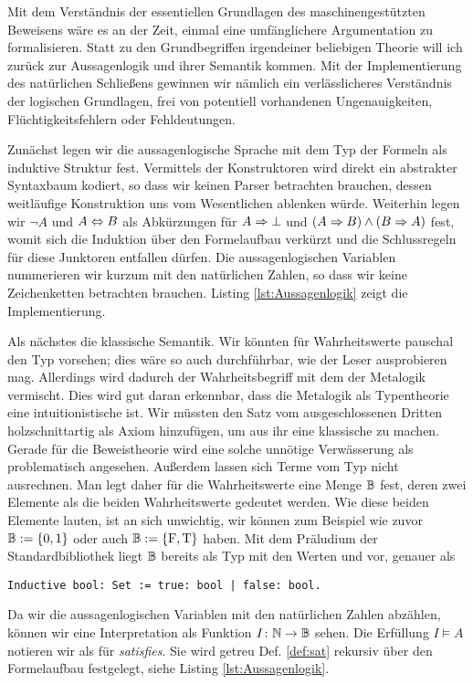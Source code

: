 Mit dem Verständnis der essentiellen Grundlagen des maschinengestützten
Beweisens wäre es an der Zeit, einmal eine umfänglichere Argumentation zu
formalisieren. Statt zu den Grundbegriffen irgendeiner beliebigen Theorie
will ich zurück zur Aussagenlogik und ihrer Semantik kommen. Mit der
Implementierung des natürlichen Schließens gewinnen wir nämlich ein
verlässlicheres Verständnis der logischen Grundlagen, frei von potentiell
vorhandenen Ungenauigkeiten, Flüchtigkeitsfehlern oder Fehldeutungen.

Zunächst legen wir die aussagenlogische Sprache mit dem Typ der Formeln
als induktive Struktur fest. Vermittels der Konstruktoren wird direkt ein
abstrakter Syntaxbaum kodiert, so dass wir keinen Parser betrachten brauchen,
dessen weitläufige Konstruktion uns vom Wesentlichen ablenken würde.
Weiterhin legen wir $\lnot A$ und $A\Leftrightarrow B$
als Abkürzungen für $A\Rightarrow\bot$ und $(A\Rightarrow B)\land (B\Rightarrow A)$ fest,
womit sich die Induktion über den Formelaufbau verkürzt und die Schlussregeln
für diese Junktoren entfallen dürfen. Die aussagenlogischen Variablen
nummerieren wir kurzum mit den natürlichen Zahlen, so dass wir keine
Zeichenketten betrachten brauchen. Listing \ref{lst:Aussagenlogik}
zeigt die Implementierung.

Als nächstes die klassische Semantik. Wir könnten für Wahrheitswerte
pauschal den Typ  vorsehen; dies wäre so auch durchführbar, wie
der Leser ausprobieren mag. Allerdings wird dadurch der Wahrheitsbegriff
mit dem der Metalogik vermischt. Dies wird gut daran erkennbar, dass die
Metalogik als Typentheorie eine intuitionistische ist. Wir müssten
den Satz vom ausgeschlossenen Dritten holzschnittartig als Axiom hinzufügen,
um aus ihr eine klassische zu machen. Gerade für die Beweistheorie wird
eine solche unnötige Verwässerung als problematisch angesehen. Außerdem lassen
sich Terme vom Typ  nicht ausrechnen. Man legt daher für die
Wahrheitswerte eine Menge $\mathbb B$ fest, deren zwei Elemente als die beiden
Wahrheitswerte gedeutet werden. Wie diese beiden Elemente lauten, ist
an sich unwichtig, wir können zum Beispiel wie zuvor $\mathbb B:=\{0,1\}$ oder auch
$\mathbb B:=\{\mathrm F,\mathrm T\}$ haben. Mit dem Präludium der Standardbibliothek
liegt $\mathbb B$ bereits als Typ  mit den Werten 
und  vor, genauer als
\begin{lstlisting}[language=Coq, xleftmargin=\mathindent]
Inductive bool: Set := true: bool | false: bool.
\end{lstlisting}
Da wir die aussagenlogischen Variablen mit den natürlichen Zahlen abzählen,
können wir eine Interpretation als Funktion $I\colon\mathbb N\to\mathbb B$ sehen.
Die Erfüllung $I\models A$ notieren wir als  für
\emph{satisfies}. Sie wird getreu Def. \ref{def:sat} rekursiv über den
Formelaufbau festgelegt, siehe Listing \ref{lst:Aussagenlogik}.

